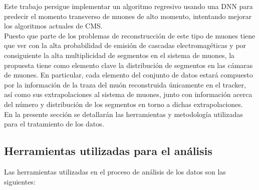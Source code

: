 Este trabajo persigue implementar un algoritmo regresivo usando una DNN para predecir el momento transverso de muones de alto momento, intentando mejorar los algoritmos actuales de CMS. \\
Puesto que parte de los problemas de reconstrucci\'on de este tipo de muones tiene que ver con la alta probabilidad de emisi\'on de cascadas electromag\'eticas y por consiguiente la alta multiplicidad de segmentos en el sistema de muones, la propuesta tiene como elemento clave la distribuci\'on de segmentos en las c\'amaras de muones. En particular, cada elemento del conjunto de datos estar\'a compuesto por la informaci\'on de la traza del mu\'on reconstruida \'unicamente en el tracker, as\'i como sus extrapolaciones al sistema de muones, junto con informaci\'on acerca del n\'umero y distribuci\'on de los segmentos en torno a dichas extrapolaciones. \\

En la presente secci\'on se detallar\'an las herramientas y metodolog\'ia utilizadas para el tratamiento de los datos.


\subsection{Herramientas utilizadas para el an\'alisis}\label{sec:tools}

Las herramientas utilizadas en el proceso de an\'alisis de los datos son las siguientes:

